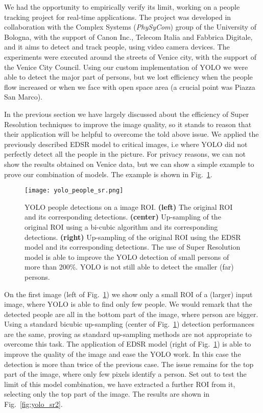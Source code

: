 \documentclass{standalone}
\begin{document}
We had the opportunity to empirically verify its limit, working on a people tracking project for real-time applications.
The project was developed in collaboration with the Complex Systems (\emph{PhySyCom}) group of the University of Bologna, with the support of Canon Inc., Telecom Italia and Fabbrica Digitale, and it aims to detect and track people, using video camera devices.
The experiments were executed around the streets of Venice city, with the support of the Venice City Council.
Using our custom implementation of YOLO we were able to detect the major part of persons, but we lost efficiency when the people flow increased or when we face with open space area (a crucial point was Piazza San Marco).

In the previous section we have largely discussed about the efficiency of Super Resolution techniques to improve the image quality, so it stands to reason that their application will be helpful to overcome the told above issue.
We applied the previously described EDSR model to critical images, i.e where YOLO did not perfectly detect all the people in the picture.
For privacy reasons, we can not show the results obtained on Venice data, but we can show a simple example to prove our combination of models.
The example is shown in Fig.~\ref{fig:yolo_sr}.

\begin{figure}[htbp]
\centering
\texttt{[image: yolo\_people\_sr.png]}
\caption{YOLO people detections on a image ROI.
\textbf{(left)} The original ROI and its corresponding detections.
\textbf{(center)} Up-sampling of the original ROI using a bi-cubic algorithm and its corresponding detections.
\textbf{(right)} Up-sampling of the original ROI using the EDSR model and its corresponding detections.
The use of Super Resolution model is able to improve the YOLO detection of small persons of more than 200\%.
YOLO is not still able to detect the smaller (far) persons.
}
\label{fig:yolo_sr}
\end{figure}

On the first image (left of Fig.~\ref{fig:yolo_sr}) we show only a small ROI of a (larger) input image, where YOLO is able to find only few people.
We would remark that the detected people are all in the bottom part of the image, where person  are bigger.
Using a standard bicubic up-sampling (center of Fig.~\ref{fig:yolo_sr}) detection performances are the same, proving as standard up-sampling methods are not appropriate to overcome this task.
The application of EDSR model (right of Fig.~\ref{fig:yolo_sr}) is able to improve the quality of the image and ease the YOLO work.
In this case the detection is more than twice of the previous case.
The issue remains for the top part of the image, where only few pixels identify a person.
Set out to test the limit of this model combination, we have extracted a further ROI from it, selecting only the top part of the image.
The results are shown in Fig.~\ref{fig:yolo_sr2}.
\end{document}
